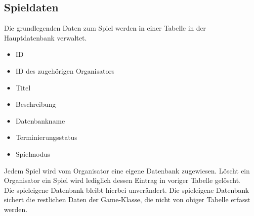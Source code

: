 \documentclass[a4paper]{scrreprt}
\begin{document}
	\subsection{Spieldaten}
	Die grundlegenden Daten zum Spiel werden in einer Tabelle in der Hauptdatenbank verwaltet.
	\begin{itemize}
		\item ID
        \item ID des zugehörigen Organisators
		\item Titel
		\item Beschreibung
		\item Datenbankname
		\item Terminierungsstatus
		\item Spielmodus
	\end{itemize}
	Jedem Spiel wird vom Organisator eine eigene Datenbank zugewiesen.
	Löscht ein Organisator ein Spiel wird lediglich dessen Eintrag in voriger Tabelle gelöscht.
	Die spieleigene Datenbank bleibt hierbei unverändert.
	Die spieleigene Datenbank sichert die restlichen Daten der Game-Klasse, die nicht von obiger Tabelle erfasst werden.
	
	
\end{document}
